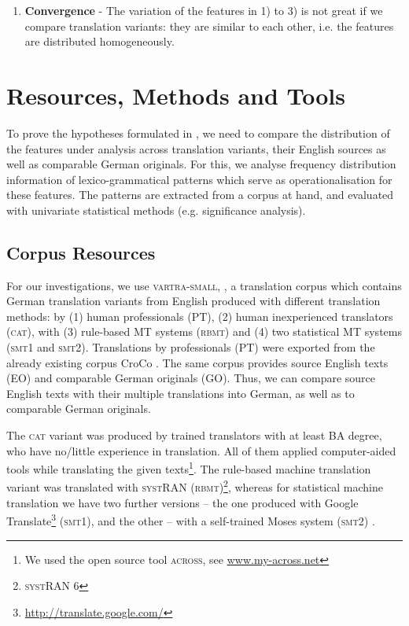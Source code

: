 \documentclass[output=paper]{LSP/langsci}
\begin{document}
\begin{enumerate}
\item \textbf{Convergence} - The variation of the features in 1) to 3) is not great if we compare translation variants: they are similar to each other, i.e. the features are distributed homogeneously.
\end{enumerate}

\section{Resources, Methods and Tools} \label{sec:4:3}

To prove the hypotheses formulated in , we need to compare the distribution of the features under analysis across translation variants, their English sources as well as comparable German originals. For this, we analyse frequency distribution information of lexico-grammatical patterns which serve as operationalisation for these features. The patterns are extracted from a corpus at hand, and evaluated with univariate statistical methods (e.g. significance analysis).

\subsection{Corpus Resources} \label{sec:4:3:1}
For our investigations, we use \textsc{vartra}-\textsc{small}, \citep[see][]{Lapshinova2013}, a translation corpus which contains German translation variants from English produced with different translation methods: by (1) human professionals (PT), (2) human inexperienced translators (\textsc{cat}), with (3) rule-based MT systems (\textsc{rbmt}) and (4) two statistical MT systems (\textsc{smt}1 and \textsc{smt}2). Translations by professionals (PT) were exported from the already existing corpus CroCo \citep{HansenSchirra2013}. The same corpus provides source English texts (EO) and comparable German originals (GO). Thus, we can compare source English texts with their multiple translations into German, as well as to comparable German originals.

The \textsc{cat} variant was produced by trained translators with at least BA degree, who have no/little experience in translation. All of them applied computer-aided tools while translating the given texts\footnote{We used the open source tool \textsc{across}, see \url{www.my-across.net}}. The rule-based machine translation variant was translated with \textsc{sy}\textsc{st}RAN (\textsc{rbmt})\footnote{\textsc{sy}\textsc{st}RAN 6}, whereas for statistical machine translation we have two further versions – the one produced with Google Translate\footnote{\url{http://translate.google.com/}} (\textsc{smt}1), and the other – with a self-trained Moses system (\textsc{smt}2) \citep[see][]{Hoang2007}.
\end{document}
